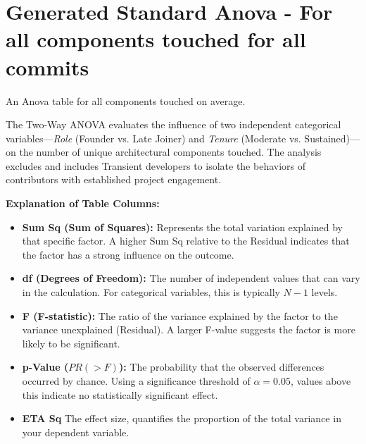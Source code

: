 \section{Generated Standard Anova - For all components touched for all commits} 
An Anova table for all components touched on average. 

The Two-Way ANOVA evaluates the influence of two independent categorical variables—\textit{Role} (Founder vs. Late Joiner) and \textit{Tenure} (Moderate vs. Sustained)—on the number of unique architectural components touched. The analysis excludes and includes Transient developers to isolate the behaviors of contributors with established project engagement.

\textbf{Explanation of Table Columns:}
\begin{itemize}
    \item \textbf{Sum Sq (Sum of Squares):} Represents the total variation explained by that specific factor. A higher Sum Sq relative to the Residual indicates that the factor has a strong influence on the outcome.
    \item \textbf{df (Degrees of Freedom):} The number of independent values that can vary in the calculation. For categorical variables, this is typically $N-1$ levels.
    \item \textbf{F (F-statistic):} The ratio of the variance explained by the factor to the variance unexplained (Residual). A larger F-value suggests the factor is more likely to be significant.
    \item \textbf{p-Value ($PR(>F)$):} The probability that the observed differences occurred by chance. Using a significance threshold of $\alpha = 0.05$, values above this indicate no statistically significant effect.
    \item \textbf{ETA Sq} The effect size, quantifies the proportion of the total variance in your dependent variable. 
\end{itemize}

